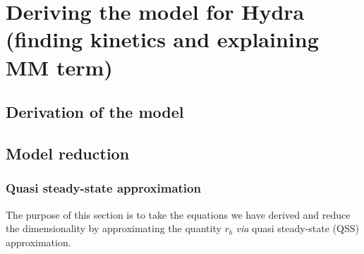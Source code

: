 
\section{Deriving the model for Hydra (finding kinetics and explaining MM term)}

\subsection{Derivation of the model}

\subsection{Model reduction}

\subsubsection{Quasi steady-state approximation}

 The purpose of this section is to take the equations we have derived and reduce the dimensionality by approximating the quantity $r_b$ \textit{via} quasi steady-state (QSS) approximation. 
% 

